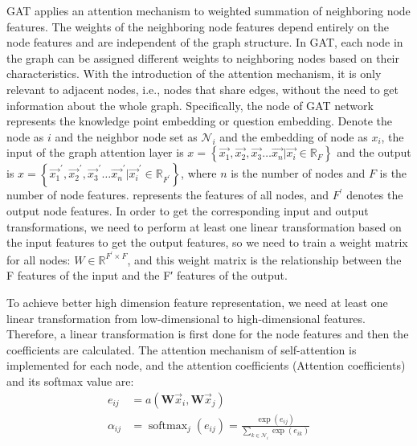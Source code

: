 GAT applies an attention mechanism to weighted summation of neighboring node features. The weights of the neighboring node features depend entirely on the node features and are independent of the graph structure. In GAT, each node in the graph can be assigned different weights to neighboring nodes based on their characteristics. With the introduction of the attention mechanism, it is only relevant to adjacent nodes, i.e., nodes that share edges, without the need to get information about the whole graph. Specifically, the node of GAT network represents the knowledge point embedding or question embedding. Denote the node as $i$ and the neighbor node set as $\mathcal{N}_{i}$ and the embedding of node as $x_i$, the input of the graph attention layer is $x=\left\{\overrightarrow{x_{1}}, \overrightarrow{x_{2}}, \overrightarrow{x_{3}} \ldots \overrightarrow{x_{n}}|\overrightarrow{x_{i}}\in \mathbb{R}_{F}\right\}$ and the output is $ x=\left\{\overrightarrow{x_{1}}^{\prime}, \overrightarrow{x_{2}}^{\prime}, \overrightarrow{x_{3}}^{\prime} \ldots \overrightarrow{x_{n}}^{\prime}|\overrightarrow{x_{i}}^\prime\in \mathbb{R}_{F^\prime}\right\}$, where $n$ is the number of nodes and $F$ is the number of node features. represents the features of all nodes, and $F^{\prime}$ denotes the output node features. In order to get the corresponding input and output transformations, we need to perform at least one linear transformation based on the input features to get the output features, so we need to train a weight matrix for all nodes: $W \in \mathbb { R } ^ { F ^ { \prime } \times F }$, and this weight matrix is the relationship between the F features of the input and the F′ features of the output.

To achieve better high dimension feature representation, we need at least one linear transformation from low-dimensional to high-dimensional features. Therefore, a linear transformation is first done for the node features and then the coefficients are calculated. The attention mechanism of self-attention is implemented for each node, and the attention coefficients (Attention coefficients) and its softmax value are:
\begin{align}
	e_{i j}      & =a\left(\mathbf{W} \vec{x}_{i}, \mathbf{W} \vec{x}_{j}\right)                                                                            \\
	\alpha_{i j} & =\operatorname{softmax}_{j}\left(e_{i j}\right)=\frac{\exp \left(e_{i j}\right)}{\sum_{k \in \mathcal{N}_{i}} \exp \left(e_{i k}\right)}
\end{align}

